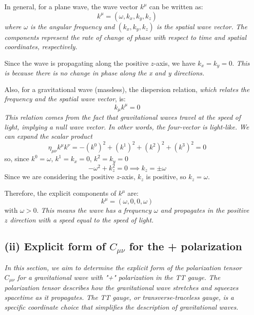 In general, for a plane wave, the wave vector $k^{\mu}$ can be written as:
\begin{equation}
k^{\mu} = (\omega, k_x, k_y, k_z)
\end{equation}
\emph{where $\omega$ is the angular frequency and $(k_x, k_y, k_z)$ is the spatial wave vector. The components represent the rate of change of phase with respect to time and spatial coordinates, respectively.}

Since the wave is propagating along the positive $z$-axis, we have $k_x = k_y = 0$. \emph{This is because there is no change in phase along the x and y directions.}

Also, for a gravitational wave (massless), the dispersion relation, \emph{which relates the frequency and the spatial wave vector}, is:
\begin{equation}
k_{\mu}k^{\mu}=0
\end{equation}
\emph{This relation comes from the fact that gravitational waves travel at the speed of light, implying a null wave vector. In other words, the four-vector is light-like. We can expand the scalar product}
\begin{equation}
\eta_{\mu\nu}k^{\mu}k^{\nu}= -\left(k^{0}\right)^{2}+\left(k^{1}\right)^{2}+\left(k^{2}\right)^{2}+\left(k^{3}\right)^{2}=0
\end{equation}
so, since $k^{0}=\omega$, $k^{1}=k_{x}=0$, $k^{2}=k_{y}=0$
\begin{equation}
-\omega^{2}+k_{z}^{2}=0 \implies k_{z}=\pm \omega
\end{equation}
Since we are considering the positive $z$-axis, $k_z$ is positive, so $k_z = \omega$.

Therefore, the explicit components of $k^{\mu}$ are:
\begin{equation}
k^{\mu} = (\omega, 0, 0, \omega)
\end{equation}
with $\omega > 0$. \emph{This means the wave has a frequency $\omega$ and propagates in the positive $z$ direction with a speed equal to the speed of light.}

\subsection*{(ii) Explicit form of $C_{\mu \nu}$ for the + polarization}

\emph{In this section, we aim to determine the explicit form of the polarization tensor $C_{\mu \nu}$ for a gravitational wave with "+" polarization in the TT gauge. The polarization tensor describes how the gravitational wave stretches and squeezes spacetime as it propagates. The TT gauge, or transverse-traceless gauge, is a specific coordinate choice that simplifies the description of gravitational waves.}


